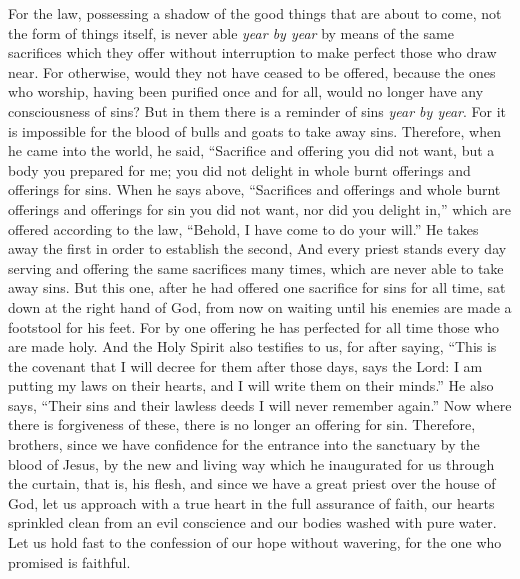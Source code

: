 \begin{biblechapter} %
 For the law, possessing a shadow of the good things that are about to come, not the form of things itself, is never able \textit{year by year} by means of the same sacrifices which they offer without interruption to make perfect those who draw near.
\verse For otherwise, would they not have ceased to be offered, because the ones who worship, having been purified once and for all, would no longer have any consciousness of sins?
\verse But in them there is a reminder of sins \textit{year by year}.
\verse For it is impossible for the blood of bulls and goats to take away sins.
\verse Therefore, when he came into the world, he said,
\verse “Sacrifice and offering you did not want, 
but a body you prepared for me;
\verse you did not delight in whole burnt offerings and offerings for sins.
\verse When he says above, “Sacrifices and offerings and whole burnt offerings and offerings for sin 
you did not want, nor did you delight in,”
\verse which are offered according to the law, “Behold, I have come to do your will.”
\verse He takes away the first in order to establish the second,
\verse And every priest stands every day serving and offering the same sacrifices many times, which are never able to take away sins.
\verse But this one, after he had offered one sacrifice for sins for all time, sat down at the right hand of God,
\verse from now on waiting until his enemies are made a footstool for his feet.
\verse For by one offering he has perfected for all time those who are made holy.
\verse And the Holy Spirit also testifies to us, for after saying,
\verse “This is the covenant that I will decree for them 
after those days, says the Lord: 
I am putting my laws on their hearts, 
and I will write them on their minds.”
\verse He also says, “Their sins and their lawless deeds I will never remember again.”
\verse Now where there is forgiveness of these, there is no longer an offering for sin.
 Therefore, brothers, since we have confidence for the entrance into the sanctuary by the blood of Jesus,
\verse by the new and living way which he inaugurated for us through the curtain, that is, his flesh,
\verse and since we have a great priest over the house of God,
\verse let us approach with a true heart in the full assurance of faith, our hearts sprinkled clean from an evil conscience and our bodies washed with pure water.
\verse Let us hold fast to the confession of our hope without wavering, for the one who promised is faithful.

\end{biblechapter}
